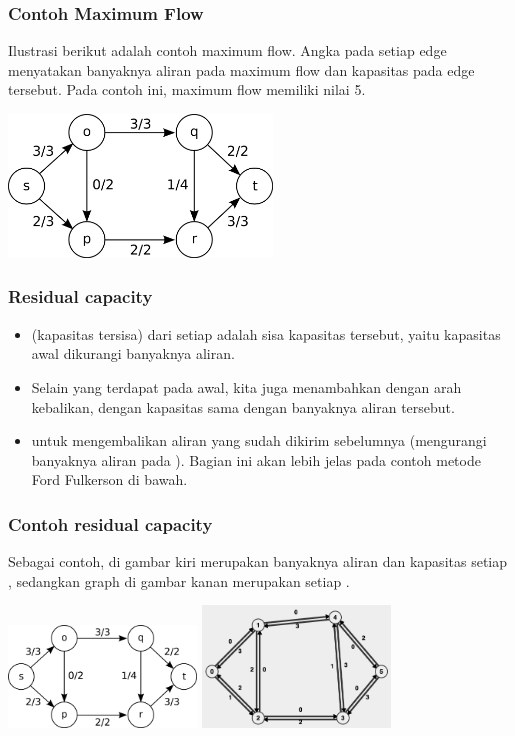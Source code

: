 \begin{frame}
\frametitle{Contoh Maximum Flow}
Ilustrasi berikut adalah contoh maximum flow.
\newline
Angka pada setiap edge menyatakan banyaknya aliran pada maximum flow dan kapasitas pada edge tersebut. Pada contoh ini, maximum flow memiliki nilai 5.
\newline
\begin{center}
\includegraphics[width=7cm]{asset/example.png}
\end{center}
\end{frame}

\begin{frame}
\frametitle{Residual capacity}
\begin{itemize}
  \item {} (kapasitas tersisa) dari setiap \fedge adalah sisa kapasitas \fedge tersebut, yaitu kapasitas awal dikurangi banyaknya aliran.
  \item Selain \fedge yang terdapat pada \fgraph awal, kita juga menambahkan \fbackEdge dengan arah kebalikan, dengan kapasitas sama dengan banyaknya aliran \fedge tersebut.
  \item \fBackEdge untuk mengembalikan aliran yang sudah dikirim sebelumnya (mengurangi banyaknya aliran pada \fedge). Bagian ini akan lebih jelas pada contoh metode Ford Fulkerson di bawah.
\end{itemize}
\end{frame}

\begin{frame}
\frametitle{Contoh residual capacity}
Sebagai contoh, \fgraph di gambar kiri merupakan banyaknya aliran dan kapasitas setiap \fedge, sedangkan graph di gambar kanan merupakan \fresidualCapacity setiap \fedge.
\newline
\begin{center}
\includegraphics[width=5cm]{asset/example.png}
\includegraphics[width=5cm]{asset/residual-capacity.png}
\end{center}
\end{frame}

